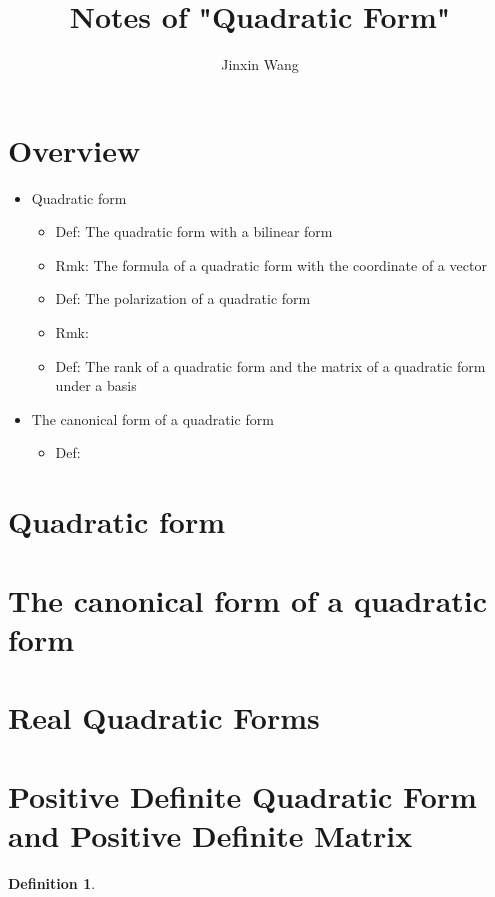 \documentclass[onecolumn]{ctexart}
\title{Notes of "Quadratic Form"}
\author{Jinxin Wang}
\date{}
\newtheorem{definition}{Definition}
\begin{document}
\maketitle

\section{Overview}
\begin{itemize}
  \item Quadratic form
  \begin{itemize}
    \item Def: The quadratic form with a bilinear form
    \item Rmk: The formula of a quadratic form with the coordinate of a vector
    \item Def: The polarization of a quadratic form
    \item Rmk: 
    \item Def: The rank of a quadratic form and the matrix of a quadratic form under a basis
  \end{itemize}
  \item The canonical form of a quadratic form
  \begin{itemize}
    \item Def: 
  \end{itemize}
\end{itemize}

\section{Quadratic form}

\section{The canonical form of a quadratic form}

\section{Real Quadratic Forms}

\section{Positive Definite Quadratic Form and Positive Definite Matrix}

\begin{definition}
  
\end{definition}
\end{document}

